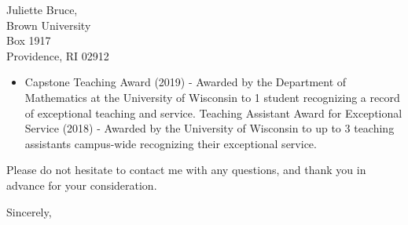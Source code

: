 \documentclass[11pt]{brownletter}
\begin{document}
\begin{letter}{Juliette Bruce,\\ 
               Brown University\\ 
               Box 1917\\ 
               Providence, RI 02912}
\begin{itemize}
\item Capstone Teaching Award (2019) - Awarded by the Department of Mathematics at the University of Wisconsin to 1 student recognizing a record of exceptional teaching and service. Teaching Assistant Award for Exceptional Service  (2018) - Awarded by the University of Wisconsin to up to 3 teaching assistants campus-wide recognizing their exceptional service.
\end{itemize}

Please do not hesitate to contact me with any questions, and thank you in advance for your consideration.

\closing{Sincerely,}




\end{letter}
\end{document}
